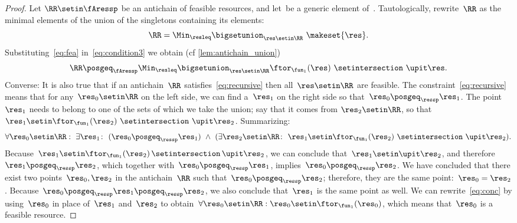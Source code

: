 \begin{proof}
    Let $\RR\setin\fAressp$ be an antichain of feasible resources, and let~\res be a generic element of~\ressp.
    Tautologically, rewrite~$\RR$ as the minimal elements of the union of the singletons containing its elements:
    \begin{equation}
        \RR=\Min_{\resleq}\bigsetunion_{\res\setin\RR}\ \makeset{\res}.
        \label{eq:condition3}
    \end{equation}
    Substituting~\cref{eq:fea} in~\cref{eq:condition3} we obtain (cf
    \cref{lem:antichain_union})
    \begin{equation}
        \RR\posgeq_{\fAressp}\Min_{\resleq}\bigsetunion_{\res\setin\RR}\ftor_{\fun_{1}}(\res)\ \setintersection\ \upit\res.
        \label{eq:recursive}
    \end{equation}
    Converse: It is also true that if an antichain~$\RR$ satisfies~\cref{eq:recursive} then all~$\res\setin\RR$ are feasible.
    The constraint~\cref{eq:recursive} means that for any~$\res_{0}\setin\RR$ on the left side, we can find a~$\res_{1}$ on the right side so that~$\res_{0}\posgeq_{\ressp}\res_{1}$.
    The point~$\res_{1}$ needs to belong to one of the sets of which we take the union; say that it comes from $\res_{2}\setin\RR$, so that $\res_{1}\setin\ftor_{\fun_{1}}(\res_{2})\ \setintersection\ \upit\res_{2}$.
    Summarizing:
    \begin{equation}
        \forall\res_{0}\setin\RR:\ \exists\res_{1}\colon\ (\res_{0}\posgeq_{\ressp}\res_{1})\ \wedge\ (\exists\res_{2}\setin\RR\colon\ \res_{1}\setin\ftor_{\fun_{1}}(\res_{2})\ \setintersection\ \upit\res_{2}).
        \label{eq:conc}
    \end{equation}
    Because~$\res_{1}\setin\ftor_{\fun_{1}}(\res_{2})\,\setintersection\,\upit\res_{2}$, we can conclude that~$\res_{1}\setin\upit\res_{2}$, and therefore~$\res_{1}\posgeq_{\ressp}\res_{2}$, which together with~$\res_{0}\posgeq_{\ressp}\res_{1}$, implies~$\res_{0}\posgeq_{\ressp}\res_{2}$.
    We have concluded that there exist two points~$\res_{0},\res_{2}$ in the antichain~$\RR$ such that~$\res_{0}\posgeq_{\ressp}\res_{2}$; therefore, they are the same point:~$\res_{0}=\res_{2}$.
    Because~$\res_{0}\posgeq_{\ressp}\res_{1}\posgeq_{\ressp}\res_{2}$, we also conclude that~$\res_{1}$ is the same point as well.
    We can rewrite~\cref{eq:conc} by using~$\res_{0}$ in place of~$\res_{1}$ and~$\res_{2}$ to obtain~$\forall\res_{0}\setin\RR:\res_{0}\setin\ftor_{\fun_{1}}(\res_{0})$,
    which means that~$\res_{0}$ is a feasible resource.


\end{proof}
